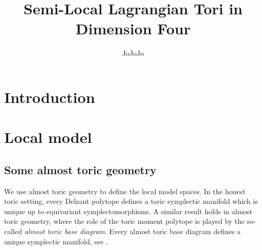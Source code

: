 \documentclass[12pt,a4paper,draft]{scrartcl}
\begin{document}
\title{Semi-Local Lagrangian Tori in Dimension Four}
\author{JoJoJo}

\maketitle


\section{Introduction}

\section{Local model}

\subsection{Some almost toric geometry}

We use almost toric geometry to define the local model spaces. In the honest toric setting, every Delzant polytope defines a toric symplectic manifold which is unique up to equivariant symplectomorphisms. A similar result holds in almost toric geometry, where the role of the toric moment polytope is played by the so-called \emph{almost toric base diagram}. Every almost toric base diagram defines a unique symplectic manifold, see \cite[Theorems 8.5]{evans2021atfs}. 
\end{document}
